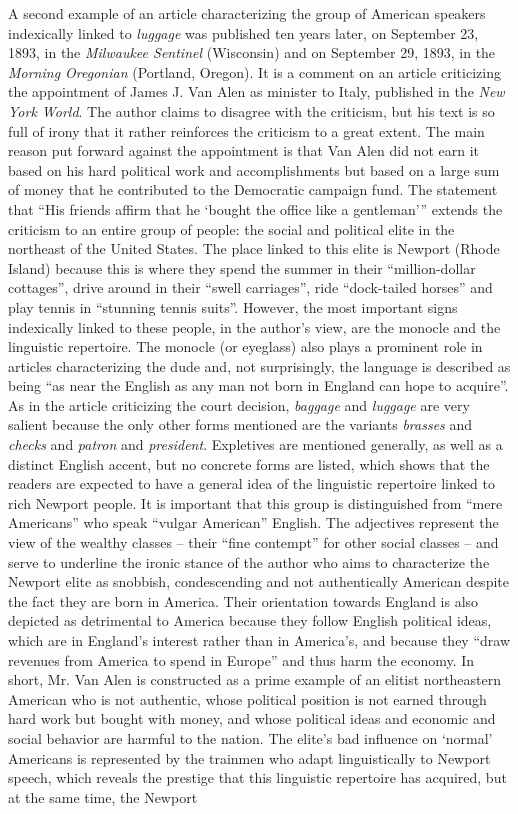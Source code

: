 A second example of an article characterizing the group of American speakers indexically linked to \emph{luggage} was published ten years later, on September 23, 1893, in the \emph{Milwaukee Sentinel} (Wisconsin) and on September 29, 1893, in the \emph{Morning Oregonian} (Portland, Oregon). It is a comment on an article criticizing the appointment of James J. Van Alen as minister to Italy, published in the \textit{New York World}. The author claims to disagree with the criticism, but his text is so full of irony that it rather reinforces the criticism to a great extent. The main reason put forward against the appointment is that Van Alen did not earn it based on his hard political work and accomplishments but based on a large sum of money that he contributed to the Democratic campaign fund. The statement that “His friends affirm that he ‘bought the office like a gentleman’” extends the criticism to an entire group of people: the social and political elite in the northeast of the United States. The place linked to this elite is Newport (Rhode Island) because this is where they spend the summer in their “million-dollar cottages”, drive around in their “swell carriages”, ride “dock-tailed horses” and play tennis in “stunning tennis suits”. However, the most important signs indexically linked to these people, in the author’s view, are the monocle and the linguistic repertoire. The monocle (or eyeglass) also plays a prominent role in articles characterizing the dude and, not surprisingly, the language is described as being “as near the English as any man not born in England can hope to acquire”. As in the article criticizing the court decision, \emph{baggage} and \emph{luggage} are very salient because the only other forms mentioned are the variants \emph{brasses} and \emph{checks} and \emph{patron} and \emph{president}. Expletives are mentioned generally, as well as a distinct English accent, but no concrete forms are listed, which shows that the readers are expected to have a general idea of the linguistic repertoire linked to rich Newport people. It is important that this group is distinguished from “mere Americans” who speak “vulgar American” English. The adjectives represent the view of the wealthy classes – their “fine contempt” for other social classes – and serve to underline the ironic stance of the author who aims to characterize the Newport elite as snobbish, condescending and not authentically American despite the fact they are born in America. Their orientation towards England is also depicted as detrimental to America because they follow English political ideas, which are in England’s interest rather than in America’s, and because they “draw revenues from America to spend in Europe” and thus harm the economy. In short, Mr. Van Alen is constructed as a prime example of an elitist northeastern American who is not authentic, whose political position is not earned through hard work but bought with money, and whose political ideas and economic and social behavior are harmful to the nation. The elite’s bad influence on ‘normal’ Americans is represented by the trainmen who adapt linguistically to Newport speech, which reveals the prestige that this linguistic repertoire has acquired, but at the same time, the Newport 